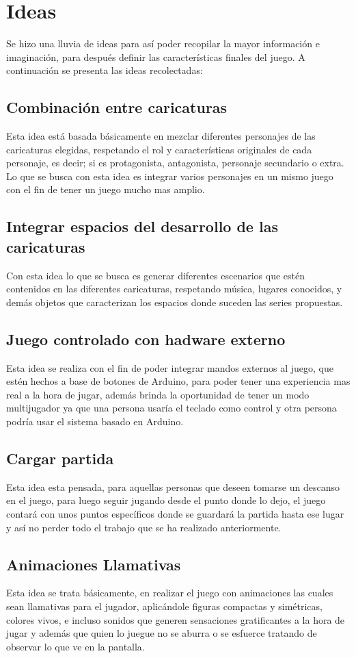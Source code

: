 \documentclass{article}
\begin{document}
\section{Ideas} \label{ideas}
Se hizo una lluvia de ideas para así poder recopilar la mayor información e imaginación, para después definir las características finales del juego. A continuación se presenta las ideas recolectadas:

\subsection{Combinación entre caricaturas}
Esta idea está basada básicamente en mezclar diferentes personajes de las  caricaturas elegidas, respetando el rol y características originales de cada personaje, es decir; si es protagonista, antagonista, personaje secundario o extra. Lo que se busca con esta idea es integrar varios personajes en un mismo juego con el fin de tener un juego mucho mas amplio.
\subsection{Integrar espacios del desarrollo de las caricaturas }
Con esta idea lo que se busca es generar diferentes escenarios que estén contenidos en las diferentes caricaturas, respetando música, lugares conocidos, y demás objetos que caracterizan los espacios donde suceden las series propuestas.
\subsection{Juego controlado con hadware externo} 
Esta idea se realiza con el fin de poder integrar mandos externos al juego, que estén hechos a base de botones de Arduino, para poder tener una experiencia mas real a la hora de jugar, además brinda la oportunidad de tener un modo multijugador ya que una persona usaría el teclado como control y otra persona podría usar el sistema basado en Arduino.
\subsection{Cargar partida}
Esta idea esta pensada, para aquellas personas que deseen tomarse un descanso en el juego, para luego seguir jugando desde el punto donde lo dejo, el juego contará con unos puntos específicos donde se guardará la partida hasta ese lugar y así no perder todo el trabajo que se ha realizado anteriormente.
\subsection{Animaciones Llamativas}
Esta idea se trata básicamente, en realizar el juego con animaciones las cuales sean llamativas para el jugador, aplicándole figuras compactas y simétricas, colores vivos, e incluso sonidos que generen sensaciones gratificantes a la hora de jugar y además que quien lo juegue no se aburra o se esfuerce tratando de observar lo que ve en la pantalla.
\end{document}
